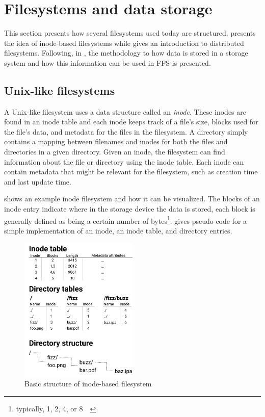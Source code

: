 \section{Filesystems and data storage}
\label{sec:fs_data_store}
This section presents how several filesystems used today are structured.  presents the idea of \mbox{inode-based} filesystems while  gives an introduction to distributed filesystems. Following, in , the methodology to how data is stored in a storage system and how this information can be used in \gls{FFS} is presented.

\subsection{\mbox{Unix-like} filesystems}
\label{sec:inodeFSintroduction}
A \mbox{Unix-like} filesystem uses a data structure called an \textit{inode}. These inodes are found in an inode table and each inode keeps track of a file's size, blocks used for the file's data, and metadata for the files in the filesystem. A directory simply contains a mapping between filenames and inodes for both the files and directories in a given directory. Given an inode, the filesystem can find information about the file or directory using the inode table. Each inode can contain metadata that might be relevant for the filesystem, such as creation time and last update time. 

 shows an example inode filesystem and how it can be visualized. The blocks of an inode entry indicate where in the storage device the data is stored, each block is generally defined as being a certain number of bytes\footnote{typically, 1, 2, 4, or \SI{8}{\kibi\byte}}.  gives pseudo-code for a simple implementation of an inode, an inode table, and directory entries. 

\begin{figure}[!ht]
	\begin{center}
	  \includegraphics[width=0.5\textwidth]{figures.nosync/inode_diagram.png}
	\end{center}
	\caption{Basic structure of \mbox{inode-based} filesystem}
	\label{fig:inode_diag}
\end{figure}

